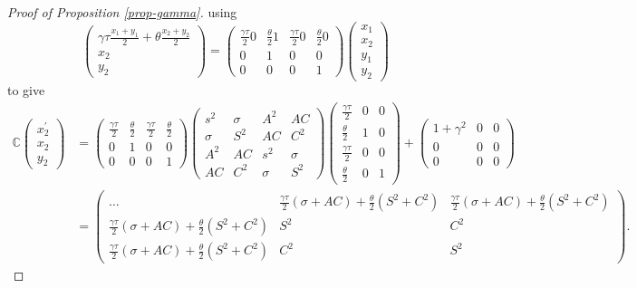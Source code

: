 \documentclass[
  12pt,
]{article}
\theoremstyle{definition}
\theoremstyle{definition}
\theoremstyle{definition}
\theoremstyle{definition}
\theoremstyle{remark}
\begin{document}
\begin{proof}[Proof of Proposition \ref{prop-gamma}]
using
\[
\left(\begin{array}{c}
\gamma\tau\frac{x_{1}+y_{1}}{2}+\theta\frac{x_{2}+y_{2}}{2}\\
x_{2}\\
y_{2}
\end{array}\right)=\left(\begin{array}{cccc}
\frac{\gamma\tau}{2}0 & \frac{\theta}{2}1 & \frac{\gamma\tau}{2}0 & \frac{\theta}{2}0\\
0 & 1 & 0 & 0\\
0 & 0 & 0 & 1
\end{array}\right)\left(\begin{array}{c}
x_{1}\\
x_{2}\\
y_{1}\\
y_{2}
\end{array}\right)
\]
to give
{\small\begin{align*}
\mathbb{C}\left(\begin{array}{c}
x_{2}^{\prime}\\
x_{2}\\
y_{2}
\end{array}\right) & =\left(\begin{array}{cccc}
\frac{\gamma\tau}{2} & \frac{\theta}{2} & \frac{\gamma\tau}{2} & \frac{\theta}{2}\\
0 & 1 & 0 & 0\\
0 & 0 & 0 & 1
\end{array}\right)\left(\begin{array}{cccc}
s^{2} & \sigma & A^{2} & AC\\
\sigma & S^{2} & AC & C^{2}\\
A^{2} & AC & s^{2} & \sigma\\
AC & C^{2} & \sigma & S^{2}
\end{array}\right)\left(\begin{array}{ccc}
\frac{\gamma\tau}{2} & 0 & 0\\
\frac{\theta}{2} & 1 & 0\\
\frac{\gamma\tau}{2} & 0 & 0\\
\frac{\theta}{2} & 0 & 1
\end{array}\right)+\left(\begin{array}{ccc}
1+\gamma^{2} & 0 & 0\\
0 & 0 & 0\\
0 & 0 & 0
\end{array}\right)\\
 & =\left(\begin{array}{ccc}
\ldots & \frac{\gamma\tau}{2}(\sigma+AC)+\frac{\theta}{2}(S^{2}+C^{2}) & \frac{\gamma\tau}{2}(\sigma+AC)+\frac{\theta}{2}(S^{2}+C^{2})\\
\frac{\gamma\tau}{2}(\sigma+AC)+\frac{\theta}{2}(S^{2}+C^{2}) & S^{2} & C^{2}\\
\frac{\gamma\tau}{2}(\sigma+AC)+\frac{\theta}{2}(S^{2}+C^{2}) & C^{2} & S^{2}
\end{array}\right).
\end{align*}}%


\end{proof}
\end{document}

